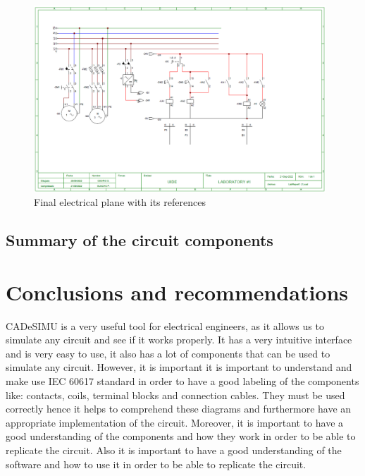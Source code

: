 \documentclass[runningheads]{llncs}
\begin{document}
\begin{figure}[!ht]
    \centering
    \caption{Final electrical plane with its references }\label{fig:CircuitPDF}
    \includegraphics[width=\linewidth, height=7cm]{ReportLaboratoryNo1/Images/CircuitPDF.png}
\end{figure}

 \newpage
\subsection{Summary of the circuit components}



\section{Conclusions and recommendations}
CADeSIMU is a very useful tool for electrical engineers, as it allows us to simulate any circuit and see if it works properly.
It has a very intuitive interface and is very easy to use, it also has a lot of components that can be used to simulate any circuit.
However, it is important it is important to understand and make use IEC 60617 standard in order to have a good labeling of the components like: 
contacts, coils, terminal blocks and connection cables.
They must be used correctly hence it helps to comprehend these diagrams and furthermore have an appropriate implementation of the circuit.
Moreover, it is important to have a good understanding of the components and how they work in order to be able to replicate the circuit. 
Also it is important to have a good understanding of the software and how to use it in order to be able to replicate the circuit.


% 
% 
\end{document}

